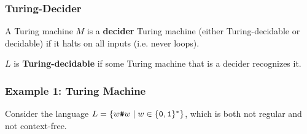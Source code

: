 \documentclass[letterpaper]{article}
\begin{document}
\subsubsection{Turing-Decider}
A Turing machine $M$ is a \textbf{decider} Turing machine (either Turing-decidable or decidable) if it halts on all inputs (i.e. never loops). 

\bigskip 

$L$ is \textbf{Turing-decidable} if some Turing machine that is a decider recognizes it. 


\subsubsection{Example 1: Turing Machine}
Consider the language $L = \{w\texttt{\#}w \mid w \in \{\texttt{0}, \texttt{1}\}^*\}$, which is both not regular and not context-free. 
\end{document}
